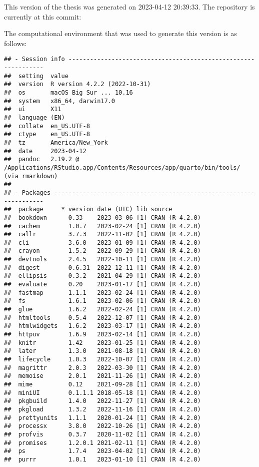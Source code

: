 \documentclass[print]{nuthesis}
\begin{document}
This version of the thesis was generated on 2023-04-12 20:39:33. The repository is currently at this commit:

The computational environment that was used to generate this version is as follows:

\begin{verbatim}
## - Session info ---------------------------------------------------------------
##  setting  value
##  version  R version 4.2.2 (2022-10-31)
##  os       macOS Big Sur ... 10.16
##  system   x86_64, darwin17.0
##  ui       X11
##  language (EN)
##  collate  en_US.UTF-8
##  ctype    en_US.UTF-8
##  tz       America/New_York
##  date     2023-04-12
##  pandoc   2.19.2 @ /Applications/RStudio.app/Contents/Resources/app/quarto/bin/tools/ (via rmarkdown)
## 
## - Packages -------------------------------------------------------------------
##  package     * version date (UTC) lib source
##  bookdown      0.33    2023-03-06 [1] CRAN (R 4.2.0)
##  cachem        1.0.7   2023-02-24 [1] CRAN (R 4.2.0)
##  callr         3.7.3   2022-11-02 [1] CRAN (R 4.2.0)
##  cli           3.6.0   2023-01-09 [1] CRAN (R 4.2.0)
##  crayon        1.5.2   2022-09-29 [1] CRAN (R 4.2.0)
##  devtools      2.4.5   2022-10-11 [1] CRAN (R 4.2.0)
##  digest        0.6.31  2022-12-11 [1] CRAN (R 4.2.0)
##  ellipsis      0.3.2   2021-04-29 [1] CRAN (R 4.2.0)
##  evaluate      0.20    2023-01-17 [1] CRAN (R 4.2.0)
##  fastmap       1.1.1   2023-02-24 [1] CRAN (R 4.2.0)
##  fs            1.6.1   2023-02-06 [1] CRAN (R 4.2.0)
##  glue          1.6.2   2022-02-24 [1] CRAN (R 4.2.0)
##  htmltools     0.5.4   2022-12-07 [1] CRAN (R 4.2.0)
##  htmlwidgets   1.6.2   2023-03-17 [1] CRAN (R 4.2.0)
##  httpuv        1.6.9   2023-02-14 [1] CRAN (R 4.2.0)
##  knitr         1.42    2023-01-25 [1] CRAN (R 4.2.0)
##  later         1.3.0   2021-08-18 [1] CRAN (R 4.2.0)
##  lifecycle     1.0.3   2022-10-07 [1] CRAN (R 4.2.0)
##  magrittr      2.0.3   2022-03-30 [1] CRAN (R 4.2.0)
##  memoise       2.0.1   2021-11-26 [1] CRAN (R 4.2.0)
##  mime          0.12    2021-09-28 [1] CRAN (R 4.2.0)
##  miniUI        0.1.1.1 2018-05-18 [1] CRAN (R 4.2.0)
##  pkgbuild      1.4.0   2022-11-27 [1] CRAN (R 4.2.0)
##  pkgload       1.3.2   2022-11-16 [1] CRAN (R 4.2.0)
##  prettyunits   1.1.1   2020-01-24 [1] CRAN (R 4.2.0)
##  processx      3.8.0   2022-10-26 [1] CRAN (R 4.2.0)
##  profvis       0.3.7   2020-11-02 [1] CRAN (R 4.2.0)
##  promises      1.2.0.1 2021-02-11 [1] CRAN (R 4.2.0)
##  ps            1.7.4   2023-04-02 [1] CRAN (R 4.2.0)
##  purrr         1.0.1   2023-01-10 [1] CRAN (R 4.2.0)

\end{verbatim}
\end{document}
